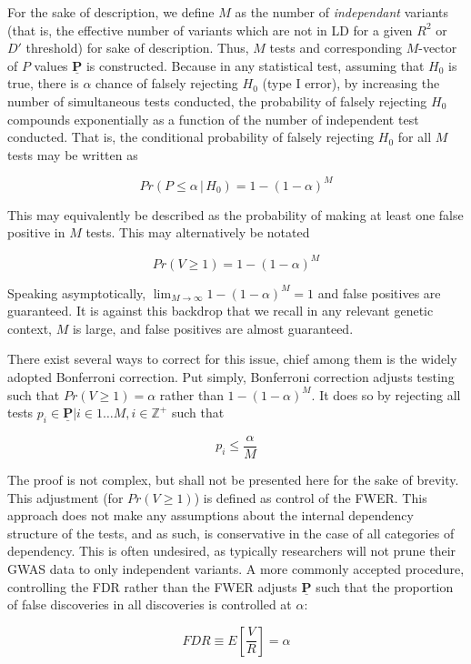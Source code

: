 For the sake of description, we define $M$ as the number of \textit{independant} variants (that is, the effective number of variants which are not in \ac{LD} for a given $R^2$ or $D'$ threshold) for sake of description. Thus, $M$ tests and corresponding $M$-vector of $P$ values $\underline{\mathbf{P}}$ is constructed. Because in any statistical test, assuming that $H_0$ is true, there is $\alpha$ chance of falsely rejecting $H_0$ (type I error), by increasing the number of simultaneous tests conducted, the probability of falsely rejecting $H_0$ compounds exponentially as a function of the number of independent test conducted. That is, the conditional probability of falsely rejecting $H_0$ for all $M$ tests may be written as 

$$ Pr(P \leq \alpha \, | \, H_0) = 1-(1 - \alpha)^M $$

This may equivalently be described as the probability of making at least one false positive in $M$ tests. This may alternatively be notated 

$$ Pr(V \geq 1) = 1-(1 - \alpha)^M $$

Speaking asymptotically, $\lim_{M \to \infty} 1-(1 - \alpha)^M = 1$ and false positives are guaranteed. It is against this backdrop that we recall in any relevant genetic context, $M$ is large, and false positives are almost guaranteed.

There exist several ways to correct for this issue, chief among them is the widely adopted Bonferroni correction. Put simply, Bonferroni correction adjusts testing such that $Pr(V \geq 1) = \alpha$ rather than $1-(1 - \alpha)^M$. It does so by rejecting all tests $p_i \in \underline{\mathbf{P}} | i \in 1 \dots M, i \in \mathbb{Z}^+$ such that

$$ p_i \leq \frac{\alpha}{M} $$


The proof is not complex, but shall not be presented here for the sake of brevity.  This adjustment (for $Pr(V \geq 1)$) is defined as control of the \ac{FWER}. This approach does not make any assumptions about the internal dependency structure of the tests, and as such, is conservative in the case of all categories of dependency. This is often undesired, as typically researchers will not prune their \ac{GWAS} data to only independent variants. A more commonly accepted procedure, controlling the \ac{FDR} rather than the \ac{FWER} adjusts $\underline{\mathbf{P}}$ such that the proportion of false discoveries in all discoveries is controlled at $\alpha$: 

$$ FDR \equiv E \left[ \frac{V}{R} \right] = \alpha $$

